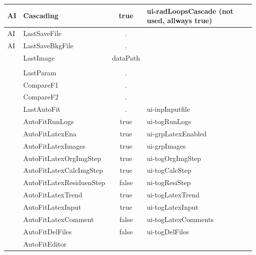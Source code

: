 \documentclass[11pt]{article} %
\begin{document}
\begin{longtable}{|l|l|c|l|}
AI & Cascading & true & ui-radLoopsCascade (not used, allways true) \\ \hline
AI & LastSaveFile & . &  \\ \hline
AI & LastSaveBkgFile & . &  \\ \hline
 & LastImage & dataPath &  \\ \hline
\rowcolor{rowkeycol}\multicolumn{4}{|c|}{Masterkey: {\it Parameter} }  \\ \hline
 & LastParam & . & \\ \hline
 & CompareF1 & . &  \\
 & CompareF2 & . &  \\ \hline
 & LastAutoFit & . & ui-inpInputfile \\ \hline
 & AutoFitRunLogs & true & ui-togRunLogs \\ \hline
 & AutoFitLatexEna & true & ui-grpLatexEnabled \\ \hline
 & AutoFitLatexImages & true & ui-grpImages \\ \hline
 & AutoFitLatexOrgImgStep & true & ui-togOrgImgStep \\ \hline
 & AutoFitLatexCalcImgStep & true & ui-togCalcStep \\ \hline
 & AutoFitLatexResiduenStep & false & ui-togResiStep \\ \hline
 & AutoFitLatexTrend & true & ui-togLatexTrend \\ \hline
 & AutoFitLatexInput & true & ui-togLatexInput \\ \hline
 & AutoFitLatexComment & false & ui-togLatexComments \\ \hline
 & AutoFitDelFiles & false & ui-togDelFiles \\ \hline
 & AutoFitEditor & &  \\ \hline

\end{longtable}
\end{document}
